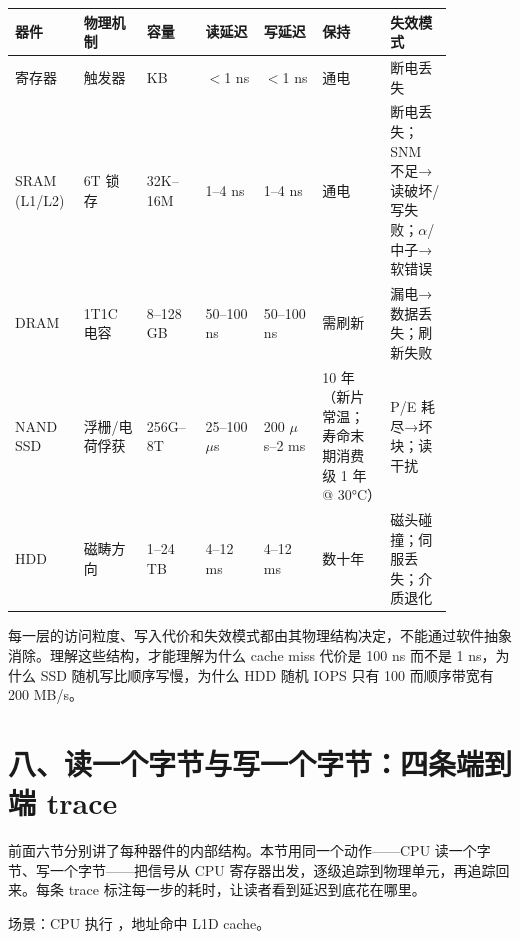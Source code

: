 \begin{longtable}{L{0.11\linewidth}L{0.13\linewidth}L{0.12\linewidth}L{0.12\linewidth}L{0.12\linewidth}L{0.14\linewidth}L{0.13\linewidth}}
\toprule
器件 & 物理机制 & 容量 & 读延迟 & 写延迟 & 保持 & 失效模式 \\
\midrule
寄存器 & 触发器 & KB & $<$1 ns & $<$1 ns & 通电 & 断电丢失 \\
SRAM (L1/L2) & 6T 锁存 & 32K--16M & 1--4 ns & 1--4 ns & 通电 & 断电丢失；SNM 不足→读破坏/写失败；$\alpha$/中子→软错误 \\
DRAM & 1T1C 电容 & 8--128 GB & 50--100 ns & 50--100 ns & 需刷新 & 漏电→数据丢失；刷新失败 \\
NAND SSD & 浮栅/电荷俘获 & 256G--8T & 25--100 $\mu$s & 200 $\mu$s--2 ms & 10 年（新片常温；寿命末期消费级 1 年 @ 30°C） & P/E 耗尽→坏块；读干扰 \\
HDD & 磁畴方向 & 1--24 TB & 4--12 ms & 4--12 ms & 数十年 & 磁头碰撞；伺服丢失；介质退化 \\
\bottomrule
\end{longtable}

每一层的访问粒度、写入代价和失效模式都由其物理结构决定，不能通过软件抽象消除。理解这些结构，才能理解为什么 cache miss 代价是 100 ns 而不是 1 ns，为什么 SSD 随机写比顺序写慢，为什么 HDD 随机 IOPS 只有 100 而顺序带宽有 200 MB/s。

\section{八、读一个字节与写一个字节：四条端到端 trace}

前面六节分别讲了每种器件的内部结构。本节用同一个动作——CPU 读一个字节、写一个字节——把信号从 CPU 寄存器出发，逐级追踪到物理单元，再追踪回来。每条 trace 标注每一步的耗时，让读者看到延迟到底花在哪里。


场景：CPU 执行 ，地址命中 L1D cache。

